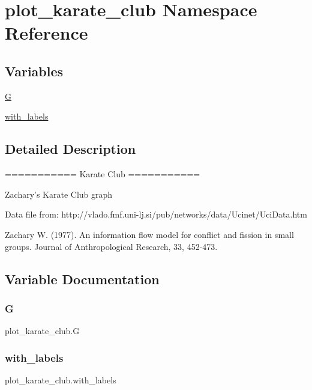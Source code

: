 \hypertarget{namespaceplot__karate__club}{}\section{plot\+\_\+karate\+\_\+club Namespace Reference}
\label{namespaceplot__karate__club}
\subsection*{Variables}
\begin{DoxyCompactItemize}
\item 
\hyperlink{namespaceplot__karate__club_ae80b9ef3c60fb1cd726c4f68f6b45031}{G}
\item 
\hyperlink{namespaceplot__karate__club_a13ef4c6d018242490863840c13ca44a2}{with\+\_\+labels}
\end{DoxyCompactItemize}


\subsection{Detailed Description}
\begin{DoxyVerb}===========
Karate Club
===========

Zachary's Karate Club graph

Data file from:
http://vlado.fmf.uni-lj.si/pub/networks/data/Ucinet/UciData.htm

Zachary W. (1977).
An information flow model for conflict and fission in small groups.
Journal of Anthropological Research, 33, 452-473.
\end{DoxyVerb}
 

\subsection{Variable Documentation}
\mbox{\label{namespaceplot__karate__club_ae80b9ef3c60fb1cd726c4f68f6b45031}} 
\subsubsection{\texorpdfstring{G}{G}}
{\footnotesize\ttfamily plot\+\_\+karate\+\_\+club.\+G}

\mbox{\label{namespaceplot__karate__club_a13ef4c6d018242490863840c13ca44a2}} 
\subsubsection{\texorpdfstring{with\+\_\+labels}{with\_labels}}
{\footnotesize\ttfamily plot\+\_\+karate\+\_\+club.\+with\+\_\+labels}

